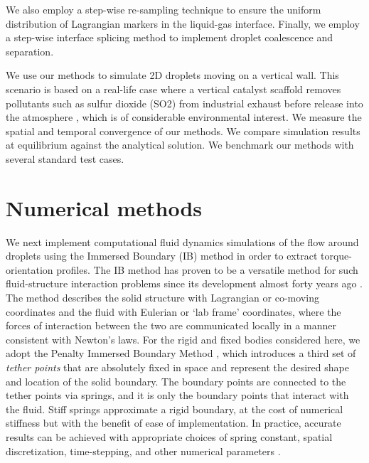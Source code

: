 \documentclass{jfm}
\begin{document}
We also employ a step-wise re-sampling technique to ensure the uniform distribution of Lagrangian markers in the liquid-gas interface. Finally, we employ a step-wise interface splicing method to implement droplet coalescence and separation. 

We use our methods to simulate 2D droplets moving on a vertical wall. This scenario is based on a real-life case where a vertical catalyst scaffold removes pollutants such as sulfur dioxide (SO2) from industrial exhaust before release into the atmosphere \cite{MPIreport2018}, which is of considerable environmental interest. We measure the spatial and temporal convergence of our methods. We compare simulation results at equilibrium against the analytical solution. We benchmark our methods with several standard test cases. 

\section{Numerical methods} \label{sec:numerical}
We next implement computational fluid dynamics simulations of the flow around droplets using the Immersed Boundary (IB) method in order to extract torque-orientation profiles. The IB method has proven to be a versatile method for such fluid-structure interaction problems since its development almost forty years ago \citep{peskin1972flow,mcqueen1997shared,arthurs1998modeling,lai2000immersed,griffith2009simulating,balboa2011staggered,devendran2012immersed,ibamradaptive}. The method describes the solid structure with Lagrangian or co-moving coordinates and the fluid with Eulerian or `lab frame' coordinates, where the forces of interaction between the two are communicated locally in a manner consistent with Newton's laws. For the rigid and fixed bodies considered here, we adopt the Penalty Immersed Boundary Method \citep{kim2016penalty}, which introduces a third set of \textit{tether points} that are absolutely fixed in space and represent the desired shape and location of the solid boundary. The boundary points are connected to the tether points via springs, and it is only the boundary points that interact with the fluid. Stiff springs approximate a rigid boundary, at the cost of numerical stiffness but with the benefit of ease of implementation. In practice, accurate results can be achieved with appropriate choices of spring constant, spatial discretization, time-stepping, and other numerical parameters \citep{kim2016penalty}. 
\end{document}
